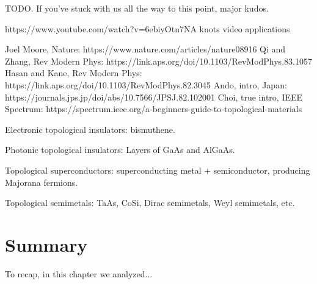 \documentclass[12pt, english]{book}
\begin{document}
TODO. 
If you've stuck with us all the way to this point, major kudos.

https://www.youtube.com/watch?v=6ebiyOtn7NA knots video applications

Joel Moore, Nature: https://www.nature.com/articles/nature08916
Qi and Zhang, Rev Modern Phys: https://link.aps.org/doi/10.1103/RevModPhys.83.1057
Hasan and Kane, Rev Modern Phys: https://link.aps.org/doi/10.1103/RevModPhys.82.3045
Ando, intro, Japan: https://journals.jps.jp/doi/abs/10.7566/JPSJ.82.102001
Choi, true intro, IEEE Spectrum: https://spectrum.ieee.org/a-beginners-guide-to-topological-materials

Electronic topological insulators: bismuthene.

Photonic topological insulators: Layers of GaAs and AlGaAs.

Topological superconductors: superconducting metal + semiconductor, producing Majorana fermions.

Topological semimetals: TaAs, CoSi, Dirac semimetals, Weyl semimetals, etc.



\section{Summary}
To recap, in this chapter we analyzed...

\end{document}
